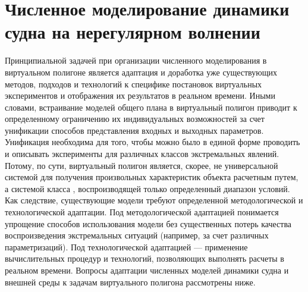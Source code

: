 \chapter{Численное моделирование динамики судна на нерегулярном волнении}


Принципиальной задачей при организации численного моделирования в виртуальном полигоне является адаптация и доработка уже существующих методов, подходов и технологий к специфике постановок виртуальных экспериментов и отображения их результатов в реальном времени. Иными словами, встраивание моделей общего плана в виртуальный полигон приводит к определенному ограничению их индивидуальных возможностей за счет унификации способов представления входных и выходных параметров. Унификация необходима для того, чтобы можно было в единой форме проводить и описывать эксперименты для различных классов экстремальных явлений. Потому, по сути, виртуальный полигон является, скорее, не универсальной системой для получения произвольных характеристик объекта расчетным путем, а системой класса , воспроизводящей только определенный диапазон условий. Как следствие, существующие модели требуют определенной методологической и технологической адаптации. Под методологической адаптацией понимается упрощение способов использования модели без существенных потерь качества воспроизведения экстремальных ситуаций (например, за счет различных параметризаций). Под технологической адаптацией –-- применение вычислительных процедур и технологий, позволяющих выполнять расчеты в реальном времени. Вопросы адаптации численных моделей динамики судна и внешней среды к задачам виртуального полигона рассмотрены ниже.